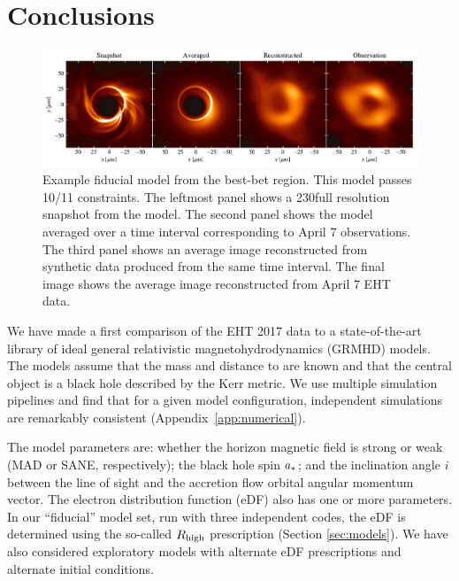 \section{Conclusions}
\label{sec:conclusions}

\begin{figure}
  \centering
  \includegraphics[width=\textwidth]{figures/bestbet_imgs.pdf}
  \caption{%
    Example fiducial model from the best-bet region.  This model passes 10/11 constraints.  The leftmost panel shows a 230\GHz full resolution snapshot from the model.  The second panel shows the model averaged over a time interval corresponding to April 7 observations.  The third panel shows an average image reconstructed from synthetic data produced from the same time interval.  The final image shows the average image reconstructed from April 7 EHT data.%
    }
  \label{fig:bestbet_imgs}
\end{figure}

We have made a first comparison of the EHT 2017 \sgra data to a state-of-the-art library of ideal general relativistic magnetohydrodynamics (GRMHD) models.
The models assume that the mass and distance to \sgra are known and that the central object is a black hole described by the Kerr metric.
We use multiple simulation pipelines and find that for a given model configuration, independent simulations are remarkably consistent (Appendix~\ref{app:numerical}).

The model parameters are: whether the horizon magnetic field is strong or weak (MAD or SANE, respectively); the black hole spin $a_*$; and the inclination angle $i$ between the line of sight and the accretion flow orbital angular momentum vector.
The electron distribution function (eDF) also has one or more parameters.
In our ``fiducial'' model set, run with three independent codes, the eDF is determined using the so-called $R_\mathrm{high}$ prescription (Section \ref{sec:models}).
We have also considered exploratory models with alternate eDF prescriptions and alternate initial conditions.

